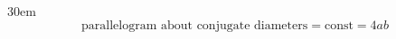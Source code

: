 \documentclass[border=4pt]{standalone}
\begin{document}
\begin{varwidth}{30em}
\large
\[ \text{parallelogram about conjugate diameters} = \text{const} = 4ab \]

\end{varwidth}
\end{document}
